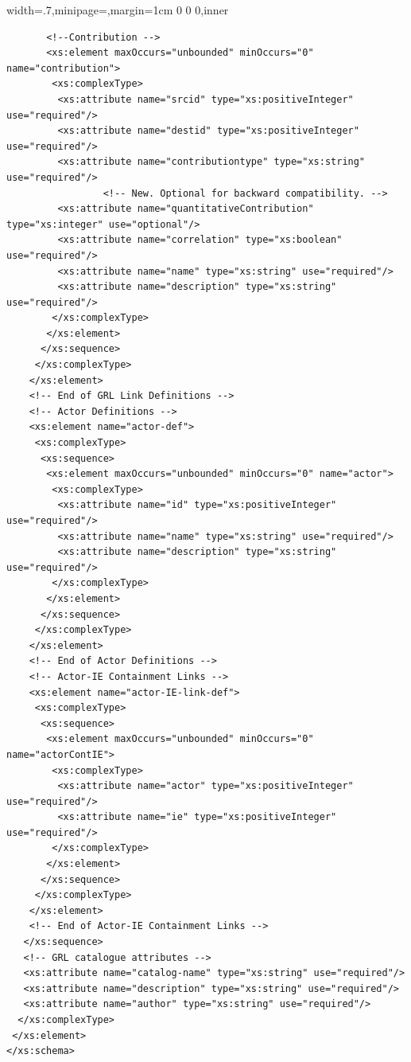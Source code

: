 \documentclass[dissertation,final]{softeng}
\newenvironment{featurecode}[1]
{ \lrbox\featurebox \begin{adjustbox}{width=#1\textwidth,minipage=\textwidth,margin=1cm 0 0 0,inner} }
{ \end{adjustbox}\endlrbox}
\newenvironment{featurelist}[2]
{
\newcommand{\setcaption}{\caption{#1}}
\newcommand{\setlabel}{\label{#2}}
}
{\begin{listing}[h!]\centering\usebox\featurebox\setcaption\setlabel\end{listing}}
\begin{document}
\begin{appendices}
\begin{featurelist}{GRL Catalogue XSD Schema -- Part two}{lst:grl_catalogue_xsd_schema_two}
\begin{featurecode}{.7}
\begin{verbatim}
	   <!--Contribution -->
	   <xs:element maxOccurs="unbounded" minOccurs="0" name="contribution">
		<xs:complexType>
		 <xs:attribute name="srcid" type="xs:positiveInteger" use="required"/>
		 <xs:attribute name="destid" type="xs:positiveInteger" use="required"/>
		 <xs:attribute name="contributiontype" type="xs:string" use="required"/>
                 <!-- New. Optional for backward compatibility. -->
		 <xs:attribute name="quantitativeContribution" type="xs:integer" use="optional"/>
		 <xs:attribute name="correlation" type="xs:boolean" use="required"/>
		 <xs:attribute name="name" type="xs:string" use="required"/>
		 <xs:attribute name="description" type="xs:string" use="required"/>
		</xs:complexType>
	   </xs:element>
	  </xs:sequence>
	 </xs:complexType>
	</xs:element>
	<!-- End of GRL Link Definitions -->
    <!-- Actor Definitions -->
	<xs:element name="actor-def">
	 <xs:complexType>
	  <xs:sequence>
	   <xs:element maxOccurs="unbounded" minOccurs="0" name="actor">
	    <xs:complexType>
		 <xs:attribute name="id" type="xs:positiveInteger" use="required"/>
		 <xs:attribute name="name" type="xs:string" use="required"/>
		 <xs:attribute name="description" type="xs:string" use="required"/>
		</xs:complexType>
	   </xs:element>
	  </xs:sequence>
     </xs:complexType>
    </xs:element>
    <!-- End of Actor Definitions -->
	<!-- Actor-IE Containment Links -->
	<xs:element name="actor-IE-link-def">
	 <xs:complexType>
	  <xs:sequence>
	   <xs:element maxOccurs="unbounded" minOccurs="0" name="actorContIE">
	    <xs:complexType>
		 <xs:attribute name="actor" type="xs:positiveInteger" use="required"/>
		 <xs:attribute name="ie" type="xs:positiveInteger" use="required"/>
		</xs:complexType>
	   </xs:element>
	  </xs:sequence>
     </xs:complexType>
    </xs:element>
    <!-- End of Actor-IE Containment Links -->
   </xs:sequence>
   <!-- GRL catalogue attributes -->
   <xs:attribute name="catalog-name" type="xs:string" use="required"/>
   <xs:attribute name="description" type="xs:string" use="required"/>
   <xs:attribute name="author" type="xs:string" use="required"/>
  </xs:complexType>
 </xs:element>
</xs:schema>
\end{verbatim}
\end{featurecode}
\end{featurelist}
\end{appendices}

\printbibliography
\end{document}
